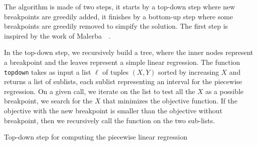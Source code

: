                 The algorithm is made of two steps, it starts by a top-down step where new breakpoints are
                greedily added, it finishes by a bottom-up step where some breakpoints are greedily removed to simpify
                the solution. The first step is inspired by the work of Malerba~\etal~\cite{Malerba_2004}.

                In the top-down step, we recursively build a tree, where the inner nodes represent a breakpoint and the
                leaves represent a simple linear regression. The function \texttt{topdown} takes as input a list
                \(\ell\) of tuples \((X,Y)\) sorted by increasing \(X\) and returns a list of sublists, each sublist
                representing an interval for the piecewise regression. On a given call, we iterate on the list to test
                all the \(X\) as a possible breakpoint, we search for the \(X\) that minimizes the objective function.
                If the objective with the new breakpoint is smaller than the objective without breakpoint, then we
                recursively call the function on the two sub-lists.
                \begin{algorithm}
                    \DontPrintSemicolon
                    \caption{Top-down step for computing the piecewise linear regression}
                    \label{algo:pytree:topdown}
                \end{algorithm}

